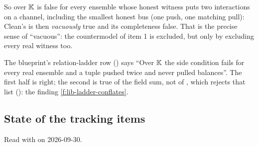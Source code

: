 \begin{enumerate}
  So over $\mathbb{K}$  is false for every ensemble whose honest witness puts two
  interactions on a channel, including the smallest honest bus (one push, one matching pull):
  Clean's  is then \emph{vacuously} true and its completeness false. That is the
  precise sense of \enquote{vacuous}: the countermodel of item 1 is excluded, but only by
  excluding every real witness too.
\end{enumerate}
The blueprint's relation-ladder row () says \enquote{Over $\mathbb{K}$ the
side condition fails for every real ensemble and a tuple pushed twice and never pulled balances}.
The first half is right; the second is true of the field sum, not of
, which rejects that list (): the
finding \cref{f:lib-ladder-conflates}.

\subsection{State of the tracking items}\label{sec:gen-lib-clean-tracking}

Read with  on 2026-09-30.

